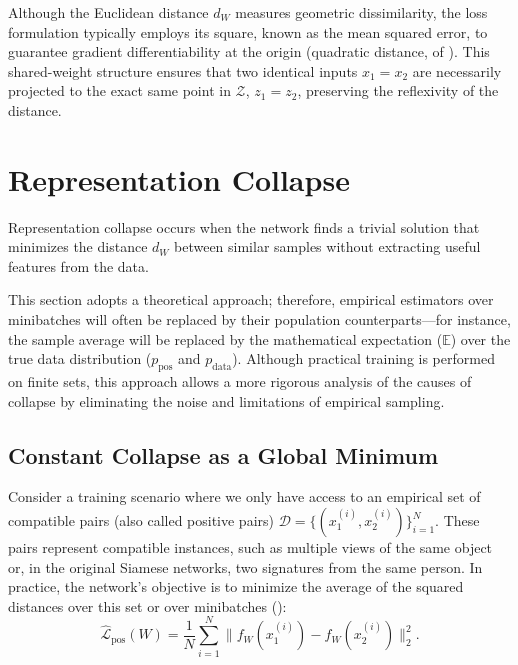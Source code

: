 \documentclass[11pt, oneside, openany]{book}
\begin{document}
Although the Euclidean distance $d_{W}$ measures geometric dissimilarity, the loss formulation typically employs its square, known as the mean squared error, to guarantee gradient differentiability at the origin (quadratic distance,  of ). This shared-weight structure ensures that two identical inputs $x_{1} = x_{2}$ are necessarily projected to the exact same point in $\mathcal{Z}$, $z_{1} = z_{2}$, preserving the reflexivity of the distance.

\section{Representation Collapse}
\label{sec:3.2}

Representation collapse occurs when the network finds a trivial solution that minimizes the distance $d_{W}$ between similar samples without extracting useful features from the data.

\begin{remark}
\label{rem:3.1}
This section adopts a theoretical approach; therefore, empirical estimators over minibatches will often be replaced by their population counterparts---for instance, the sample average will be replaced by the mathematical expectation ($\mathbb{E}$) over the true data distribution ($p_{\text{pos}}$ and $p_{\text{data}}$). Although practical training is performed on finite sets, this approach allows a more rigorous analysis of the causes of collapse by eliminating the noise and limitations of empirical sampling.
\end{remark}

\subsection{Constant Collapse as a Global Minimum}
\label{sec:3.2.1}

Consider a training scenario where we only have access to an empirical set of compatible pairs (also called positive pairs) $\mathcal{D} = \{(x_{1}^{(i)}, x_{2}^{(i)})\}_{i=1}^{N}$. These pairs represent compatible instances, such as multiple views of the same object or, in the original Siamese networks, two signatures from the same person. In practice, the network's objective is to minimize the average of the squared distances over this set or over minibatches ():
\begin{equation}
\label{eq:3.3}
\hat{\mathcal{L}}_{\text{pos}}(W) = \frac{1}{N} \sum_{i=1}^{N} \lVert f_{W}(x_{1}^{(i)}) - f_{W}(x_{2}^{(i)}) \rVert_{2}^{2}.
\end{equation}
\end{document}
